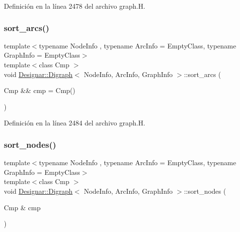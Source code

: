Definición en la línea 2478 del archivo graph.\+H.

\mbox{\label{class_designar_1_1_digraph_a44895030e02896d6d35277eec136c49f}} 
\subsubsection{\texorpdfstring{sort\+\_\+arcs()}{sort\_arcs()}\hspace{0.1cm}{\footnotesize\ttfamily [2/2]}}
{\footnotesize\ttfamily template$<$typename Node\+Info , typename Arc\+Info  = Empty\+Class, typename Graph\+Info  = Empty\+Class$>$ \\
template$<$class Cmp $>$ \\
void \hyperlink{class_designar_1_1_digraph}{Designar\+::\+Digraph}$<$ Node\+Info, Arc\+Info, Graph\+Info $>$\+::sort\+\_\+arcs (\begin{DoxyParamCaption}\item[{Cmp \&\&}]{cmp = {\ttfamily Cmp()} }\end{DoxyParamCaption})\hspace{0.3cm}{\ttfamily [inline]}}



Definición en la línea 2484 del archivo graph.\+H.

\mbox{\label{class_designar_1_1_digraph_a5d057854409452b7d4fb2f9eec217b7d}} 
\subsubsection{\texorpdfstring{sort\+\_\+nodes()}{sort\_nodes()}\hspace{0.1cm}{\footnotesize\ttfamily [1/2]}}
{\footnotesize\ttfamily template$<$typename Node\+Info , typename Arc\+Info  = Empty\+Class, typename Graph\+Info  = Empty\+Class$>$ \\
template$<$class Cmp $>$ \\
void \hyperlink{class_designar_1_1_digraph}{Designar\+::\+Digraph}$<$ Node\+Info, Arc\+Info, Graph\+Info $>$\+::sort\+\_\+nodes (\begin{DoxyParamCaption}\item[{Cmp \&}]{cmp }\end{DoxyParamCaption})\hspace{0.3cm}{\ttfamily [inline]}}



